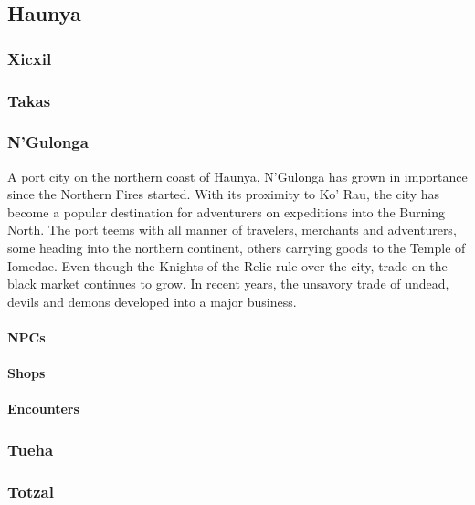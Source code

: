 	\subsection{Haunya}

		\subsubsection{Xicxil}
	
		\subsubsection{Takas}
	
		\subsubsection{N'Gulonga}

		A port city on the northern coast of Haunya, N'Gulonga has grown 
		in importance since the Northern Fires started.  With its proximity
		to Ko' Rau, the city has become a popular destination for adventurers
		on expeditions into the Burning North.  The port teems with all
		manner of travelers, merchants and adventurers, some heading into 
		the northern continent, others carrying goods to the Temple of 
		Iomedae.  Even though the Knights of the Relic rule over the city,
		trade on the black market continues to grow.  In recent years, the 
		unsavory trade of undead, devils and demons developed into a major 
		business.  

			\paragraph{NPCs}
				
			
			\paragraph{Shops}

			\paragraph{Encounters}
	
		\subsubsection{Tueha}

		\subsubsection{Totzal}

